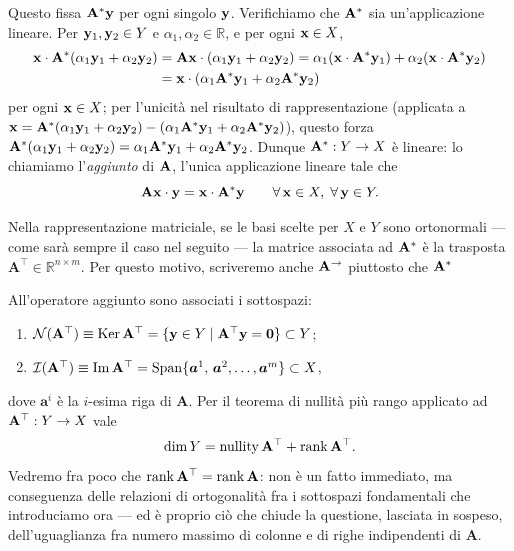 Questo fissa $\mathbf{A}^\ast\mathbf{y}$ per ogni singolo $\mathbf{y}$. Verifichiamo che $\mathbf{A}^\ast$ sia un'applicazione lineare. Per $\mathbf{y}_1,\mathbf{y}_2\in Y$ e $\alpha_1,\alpha_2\in\mathbb{R}$, e per ogni $\mathbf{x}\in X$,
\[
\begin{aligned}
	\mathbf{x}\cdot\mathbf{A}^\ast(\alpha_1\mathbf{y}_1+\alpha_2\mathbf{y}_2)&=\mathbf{A}\mathbf{x}\cdot(\alpha_1\mathbf{y}_1+\alpha_2\mathbf{y}_2)=\alpha_1(\mathbf{x}\cdot\mathbf{A}^\ast\mathbf{y}_1)+\alpha_2(\mathbf{x}\cdot\mathbf{A}^\ast\mathbf{y}_2)\\
	&=\mathbf{x}\cdot(\alpha_1\mathbf{A}^\ast\mathbf{y}_1+\alpha_2\mathbf{A}^\ast\mathbf{y}_2)
\end{aligned}
\]
per ogni $\mathbf{x}\in X$; per l'unicit\`a nel risultato di rappresentazione (applicata a $\mathbf{x}=\mathbf{A}^\ast(\alpha_1\mathbf{y}_1+\alpha_2\mathbf{y}_2)-(\alpha_1\mathbf{A}^\ast\mathbf{y}_1+\alpha_2\mathbf{A}^\ast\mathbf{y}_2)$), questo forza $\mathbf{A}^\ast(\alpha_1\mathbf{y}_1+\alpha_2\mathbf{y}_2)=\alpha_1\mathbf{A}^\ast\mathbf{y}_1+\alpha_2\mathbf{A}^\ast\mathbf{y}_2$. Dunque $\mathbf{A}^\ast:Y\to X$ \`e lineare: lo chiamiamo l'\textit{aggiunto} di $\mathbf{A}$, l'unica applicazione lineare tale che
\begin{equation}\label{eq:aggiunto}
	\mathbf{A}\mathbf{x}\cdot\mathbf{y}=\mathbf{x}\cdot\mathbf{A}^\ast\mathbf{y}
	\qquad \forall\,\mathbf{x} \in X,\;\forall\,\mathbf{y} \in Y.
\end{equation}

Nella rappresentazione matriciale, se le basi scelte per $X$ e $Y$ sono ortonormali --- come sar\`a sempre il caso nel seguito --- la matrice associata ad $\mathbf{A}^\ast$ \`e la trasposta $\bm{A}^\top \in \mathbb{R}^{n\times m}$. Per questo motivo, scriveremo anche $\mathbf{A}^\to$ piuttosto che $\mathbf{A}^\ast$


All'operatore aggiunto sono associati i sottospazi:
\begin{enumerate}[label=(\roman*)]
	\item $\mathcal{N}(\mathbf{A}^\top) \equiv \operatorname{Ker} \mathbf{A}^\top=\{\mathbf{y}\in Y \mid \mathbf{A}^\top \mathbf{y}=\mathbf{0} \}\subset Y$;
	\item $\mathcal{I}(\mathbf{A}^\top) \equiv \operatorname{Im}\mathbf{A}^\top=\operatorname{Span} \{\bm{a}^1,\,\bm{a}^2, \ldots, \bm{a}^m\}\subset X$,
\end{enumerate}
dove $\bm{a}^i$ \`e la $i$-esima riga di $\bm{A}$. Per il teorema di nullit\`a pi\`u rango applicato ad $\mathbf{A}^\top:Y\to X$ vale
\begin{equation}
	\dim Y=\operatorname{nullity}\mathbf{A}^\top+\operatorname{rank}\mathbf{A}^\top.
\end{equation}
Vedremo fra poco che $\operatorname{rank}\mathbf{A}^\top=\operatorname{rank}\mathbf{A}$: non \`e un fatto immediato, ma conseguenza delle relazioni di ortogonalit\`a fra i sottospazi fondamentali che introduciamo ora --- ed \`e proprio ci\`o che chiude la questione, lasciata in sospeso, dell'uguaglianza fra numero massimo di colonne e di righe indipendenti di $\bm{A}$.



